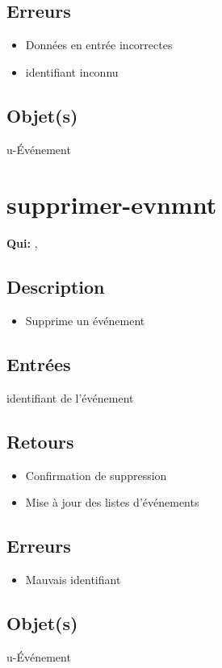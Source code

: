 	\subsection{Erreurs}
	\begin{itemize}
		\item Données en entrée incorrectes \fatal
		\item identifiant inconnu \fatal
	\end{itemize}

	\subsection{Objet(s)}
		u-Événement

\section{supprimer-evnmnt}
	\textbf{Qui:} \urt, \us

	\subsection{Description}
	\begin{itemize}
		\item Supprime un événement
	\end{itemize}

	\subsection{Entrées}
		identifiant de l'événement

	\subsection{Retours}
	\begin{itemize}
		\item Confirmation de suppression
		\item Mise à jour des listes d'événements
	\end{itemize}

	\subsection{Erreurs}
	\begin{itemize}
		\item Mauvais identifiant \fatal
	\end{itemize}

	\subsection{Objet(s)}
		u-Événement

